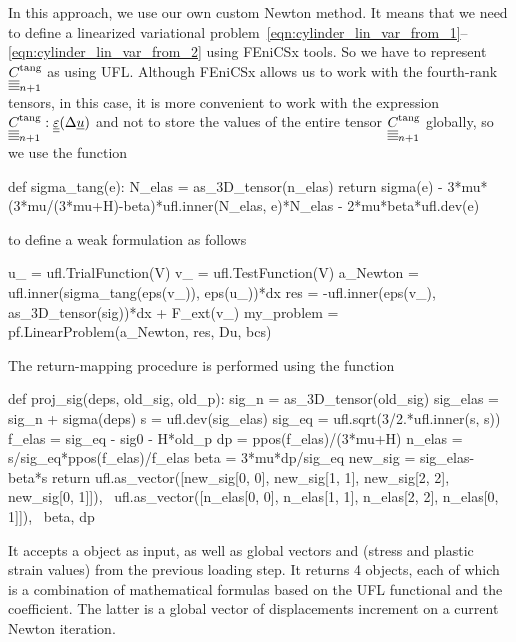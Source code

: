 \documentclass[12pt]{article}
\begin{document}
In this approach, we use our own custom Newton method. It means that we need to define a linearized variational problem~\eqref{eqn:cylinder_lin_var_from_1}--\eqref{eqn:cylinder_lin_var_from_2} using FEniCSx tools. So we have to represent $\underline{\underline{\underline{\underline{C_{}}}}}_{n+1}^\text{tang}$ as  using UFL. Although FEniCSx allows us to work with the fourth-rank tensors, in this case, it is more convenient to work with the expression $\underline{\underline{\underline{\underline{C_{}}}}}_{n+1}^\text{tang} : \underline{\underline{\varepsilon}}(\Delta\underline{u})$ and not to store the values of the entire tensor $\underline{\underline{\underline{\underline{C_{}}}}}_{n+1}^\text{tang}$ globally, so we use the function  
\begin{pythoncode}
    def sigma_tang(e):
    N_elas = as_3D_tensor(n_elas)
    return sigma(e) - 3*mu*(3*mu/(3*mu+H)-beta)*ufl.inner(N_elas, e)*N_elas - 2*mu*beta*ufl.dev(e)  
\end{pythoncode}
to define a weak formulation as follows
\begin{pythoncode}
    u_ = ufl.TrialFunction(V)
    v_ = ufl.TestFunction(V)
    a_Newton = ufl.inner(sigma_tang(eps(v_)), eps(u_))*dx
    res = -ufl.inner(eps(v_), as_3D_tensor(sig))*dx + F_ext(v_)
    my_problem = pf.LinearProblem(a_Newton, res, Du, bcs)
\end{pythoncode}
The return-mapping procedure is performed using the  function
\begin{pythoncode}
    def proj_sig(deps, old_sig, old_p):
        sig_n = as_3D_tensor(old_sig)
        sig_elas = sig_n + sigma(deps)
        s = ufl.dev(sig_elas)
        sig_eq = ufl.sqrt(3/2.*ufl.inner(s, s))
        f_elas = sig_eq - sig0 - H*old_p
        dp = ppos(f_elas)/(3*mu+H)
        n_elas = s/sig_eq*ppos(f_elas)/f_elas
        beta = 3*mu*dp/sig_eq
        new_sig = sig_elas-beta*s
        return ufl.as_vector([new_sig[0, 0], new_sig[1, 1], new_sig[2, 2], new_sig[0, 1]]), \
            ufl.as_vector([n_elas[0, 0], n_elas[1, 1], n_elas[2, 2], n_elas[0, 1]]), \
            beta, dp       
\end{pythoncode}

It accepts a  object  as input, as well as global vectors  and  (stress and plastic strain values) from the previous loading step. It returns 4  objects, each of which is a combination of mathematical formulas based on the UFL functional and the  coefficient. The latter is a global vector of displacements increment on a current Newton iteration.
\end{document}
